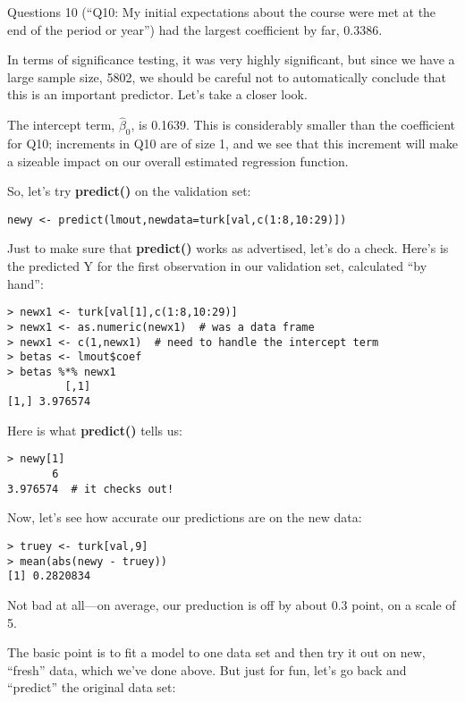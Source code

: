 Questions 10 (``Q10:  My initial expectations about the course were met
at the end of the period or year'') had the largest coefficient by far,
0.3386.  

In terms of significance testing, it was very highly significant, but
since we have a large sample size, 5802, we should be careful not to
automatically conclude that this is an important predictor.  Let's take
a closer look.

The intercept term, $\widehat{\beta}_0$, is 0.1639.  This is
considerably smaller than the coefficient for Q10; increments in Q10 are
of size 1, and we see that this increment will make a sizeable impact on
our overall estimated regression function.

So, let's try {\bf predict()} on the validation set:

\begin{lstlisting}
newy <- predict(lmout,newdata=turk[val,c(1:8,10:29)])
\end{lstlisting}

Just to make sure that {\bf predict()} works as advertised, let's do a
check.  Here's is the predicted Y for the first observation in our
validation set, calculated ``by hand'':

\begin{lstlisting}
> newx1 <- turk[val[1],c(1:8,10:29)]
> newx1 <- as.numeric(newx1)  # was a data frame
> newx1 <- c(1,newx1)  # need to handle the intercept term
> betas <- lmout$coef
> betas %*% newx1
         [,1]
[1,] 3.976574
\end{lstlisting}

Here is what {\bf predict()} tells us:

\begin{lstlisting}
> newy[1]
       6 
3.976574  # it checks out!
\end{lstlisting}

Now, let's see how accurate our predictions are on the new data:

\begin{lstlisting}
> truey <- turk[val,9]
> mean(abs(newy - truey))
[1] 0.2820834
\end{lstlisting}

Not bad at all---on average, our preduction is off by about 0.3 point,
on a scale of 5.

The basic point is to fit a model to one data set and then try it out on
new, ``fresh'' data, which we've done above.  But just for fun, let's go
back and ``predict'' the original data set:

